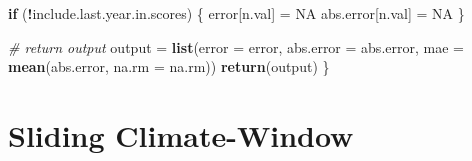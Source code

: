 \documentclass[12pt,]{book}
\newenvironment{Shaded}{\begin{snugshade}}{\end{snugshade}}
\newcommand{\KeywordTok}[1]{\textcolor[rgb]{0.13,0.29,0.53}{\textbf{#1}}}
\newcommand{\DataTypeTok}[1]{\textcolor[rgb]{0.13,0.29,0.53}{#1}}
\newcommand{\StringTok}[1]{\textcolor[rgb]{0.31,0.60,0.02}{#1}}
\newcommand{\CommentTok}[1]{\textcolor[rgb]{0.56,0.35,0.01}{\textit{#1}}}
\newcommand{\OtherTok}[1]{\textcolor[rgb]{0.56,0.35,0.01}{#1}}
\newcommand{\ControlFlowTok}[1]{\textcolor[rgb]{0.13,0.29,0.53}{\textbf{#1}}}
\newcommand{\OperatorTok}[1]{\textcolor[rgb]{0.81,0.36,0.00}{\textbf{#1}}}
\newcommand{\NormalTok}[1]{#1}
\theoremstyle{definition}
\theoremstyle{definition}
\theoremstyle{definition}
\theoremstyle{remark}
\begin{document}
\begin{Shaded}
\begin{Highlighting}[]
  \ControlFlowTok{if}\NormalTok{ (}\OperatorTok{!}\NormalTok{include.last.year.in.scores) \{}
\NormalTok{    error[n.val] =}\StringTok{ }\OtherTok{NA}
\NormalTok{    abs.error[n.val] =}\StringTok{ }\OtherTok{NA}
\NormalTok{  \} }
  
  \CommentTok{# return output}
\NormalTok{  output =}\StringTok{ }\KeywordTok{list}\NormalTok{(}\DataTypeTok{error =}\NormalTok{ error, }\DataTypeTok{abs.error =}\NormalTok{ abs.error, }\DataTypeTok{mae =} \KeywordTok{mean}\NormalTok{(abs.error, }\DataTypeTok{na.rm =}\NormalTok{ na.rm))}
  \KeywordTok{return}\NormalTok{(output)}
\NormalTok{\}}
\end{Highlighting}
\end{Shaded}

\section*{Sliding Climate-Window}\label{sliding-climate-window}


\end{document}
